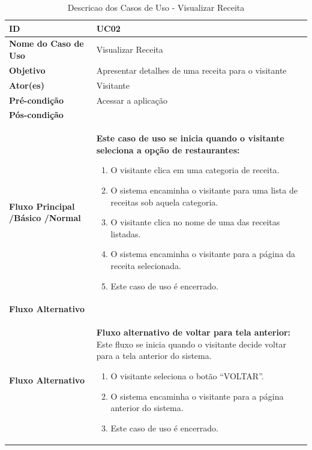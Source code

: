 \begin{table}[t]
\begin{tabular}{| p{6cm} | p{10cm} |}
	\hline
	\textbf{ID} & UC02\tabularnewline
	\hline
	\hline
	\textbf{Nome do Caso de Uso} & Visualizar Receita\tabularnewline
	\hline
	\textbf{Objetivo} & Apresentar detalhes de uma receita para o visitante\tabularnewline
	\hline
	\textbf{Ator(es)} & Visitante\tabularnewline
	\hline
	\textbf{Pré-condição} & Acessar a aplicação\tabularnewline
	\hline
	\textbf{Pós-condição} & \tabularnewline
	\hline
	\textbf{Fluxo Principal /Básico /Normal} & \textbf{Este caso de uso se inicia quando o visitante seleciona a opção de restaurantes:}
	\vspace{0.2cm}
	\begin{enumerate}
		\item O visitante clica em uma categoria de receita.
		\item O sistema encaminha o visitante para uma lista de receitas sob aquela categoria.
		\item O visitante clica no nome de uma das receitas listadas.
		\item O sistema encaminha o visitante para a página da receita selecionada.
		\item Este caso de uso é encerrado.
	\end{enumerate} \tabularnewline
	\hline
	\textbf{Fluxo Alternativo} & \tabularnewline
	\hline
	\textbf{Fluxo Alternativo} & \textbf{Fluxo alternativo de voltar para tela anterior:}
	\vspace{0.2cm}
	Este fluxo se inicia quando o visitante decide voltar para a tela anterior do sistema.
	\begin{enumerate}
		\item O visitante seleciona o botão “VOLTAR”.
		\item O sistema encaminha o visitante para a página anterior do sistema.
		\item Este caso de uso é encerrado.
	\end{enumerate} \tabularnewline
	\hline
\end{tabular}
\caption{Descricao dos Casos de Uso - Visualizar Receita}
\label{DCU_Visualizar_Receita}
\end{table}

